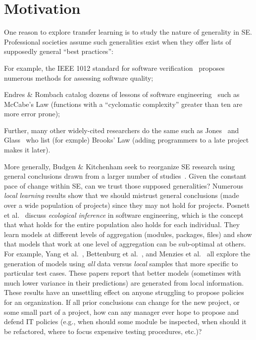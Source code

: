 \section{Motivation}
\label{sec:Motivation}

One reason to explore transfer learning
is to study the nature of
generality in SE.  Professional
societies assume such generalities exist when they
offer lists of supposedly general ``best practices'':
\squishlist
\item For example, the  IEEE 1012 standard for software
  verification~\cite{1012} proposes numerous methods for assessing software quality;
\item
 Endres \& Rombach catalog
dozens of lessons of software
engineering~\cite{endres03} such as McCabe's Law (functions with a ``cyclomatic complexity'' greater
than ten are more error prone);
\item Further, many other
widely-cited researchers do the same such as  Jones~\cite{jones10} and
Glass~\cite{glass02} who list (for exmple)
Brooks' Law (adding programmers to a late project makes it later).
\item
  More generally, Budgen \& Kitchenham seek to
reorganize SE research using general conclusions
drawn from a larger number of
studies~\cite{budgen06,budgen09}.
\squishend 
Given the constant pace of change within SE, can we trust
those supposed generalities? 
Numerous {\em local learning} results show that we
should mistrust general conclusions (made over a
wide population of projects) since they may not hold
for projects.  Posnett et al.~\cite{posnett11}
discuss {\em ecological inference} in software
engineering, which is the concept that what holds
for the entire population also holds for each
individual.  They learn models at different levels
of aggregation (modules, packages, files) and show
that models that work at one level of aggregation
can be sub-optimal at others.  For example, Yang et
al.~\cite{yang11}, Bettenburg et
al.~\cite{betten14}, and Menzies et al.~\cite{me12d}
all explore the generation of models using {\em all}
data versus {\em local} samples that more specific
to particular test cases. These papers report that
better models (sometimes with much lower variance in
their predictions) are generated from local
information.
These results have an unsettling effect on anyone
struggling to propose policies for an organization.
If all prior conclusions can change for the new
project, or some small part of a project, how can
any manager ever hope to propose and defend IT
policies (e.g., when should some module be inspected,
when should it be refactored, where to focus
expensive testing procedures, etc.)?

